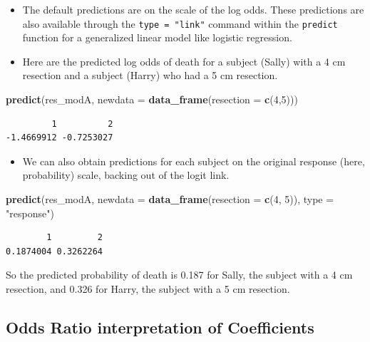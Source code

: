\documentclass[]{book}
\newenvironment{Shaded}{\begin{snugshade}}{\end{snugshade}}
\newcommand{\KeywordTok}[1]{\textcolor[rgb]{0.13,0.29,0.53}{\textbf{#1}}}
\newcommand{\DataTypeTok}[1]{\textcolor[rgb]{0.13,0.29,0.53}{#1}}
\newcommand{\DecValTok}[1]{\textcolor[rgb]{0.00,0.00,0.81}{#1}}
\newcommand{\StringTok}[1]{\textcolor[rgb]{0.31,0.60,0.02}{#1}}
\newcommand{\NormalTok}[1]{#1}
\providecommand{\tightlist}{%
  \setlength{\itemsep}{0pt}\setlength{\parskip}{0pt}}
\theoremstyle{definition}
\theoremstyle{definition}
\theoremstyle{definition}
\theoremstyle{remark}
\begin{document}
\begin{itemize}
\tightlist
\item
  The default predictions are on the scale of the log odds. These
  predictions are also available through the \texttt{type\ =\ "link"}
  command within the \texttt{predict} function for a generalized linear
  model like logistic regression.
\item
  Here are the predicted log odds of death for a subject (Sally) with a
  4 cm resection and a subject (Harry) who had a 5 cm resection.
\end{itemize}

\begin{Shaded}
\begin{Highlighting}[]
\KeywordTok{predict}\NormalTok{(res_modA, }\DataTypeTok{newdata =} \KeywordTok{data_frame}\NormalTok{(}\DataTypeTok{resection =} \KeywordTok{c}\NormalTok{(}\DecValTok{4}\NormalTok{,}\DecValTok{5}\NormalTok{)))}
\end{Highlighting}
\end{Shaded}

\begin{verbatim}
         1          2 
-1.4669912 -0.7253027 
\end{verbatim}

\begin{itemize}
\tightlist
\item
  We can also obtain predictions for each subject on the original
  response (here, probability) scale, backing out of the logit link.
\end{itemize}

\begin{Shaded}
\begin{Highlighting}[]
\KeywordTok{predict}\NormalTok{(res_modA, }\DataTypeTok{newdata =} \KeywordTok{data_frame}\NormalTok{(}\DataTypeTok{resection =} \KeywordTok{c}\NormalTok{(}\DecValTok{4}\NormalTok{, }\DecValTok{5}\NormalTok{)), }
        \DataTypeTok{type =} \StringTok{"response"}\NormalTok{)}
\end{Highlighting}
\end{Shaded}

\begin{verbatim}
        1         2 
0.1874004 0.3262264 
\end{verbatim}

So the predicted probability of death is 0.187 for Sally, the subject
with a 4 cm resection, and 0.326 for Harry, the subject with a 5 cm
resection.

\subsection{Odds Ratio interpretation of
Coefficients}\label{odds-ratio-interpretation-of-coefficients}
\end{document}

